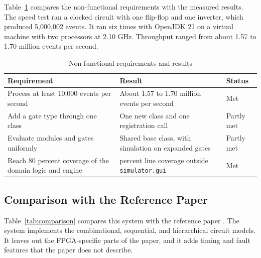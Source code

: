Table~\ref{tab:nfr} compares the non-functional requirements with the measured results.
The speed test ran a clocked circuit with one flip-flop and one inverter, which produced 5,000,002 events.
It ran six times with OpenJDK 21 on a virtual machine with two processors at 2.10 GHz.
Throughput ranged from about 1.57 to 1.70 million events per second.

\begin{table}[H]
\centering
\small
\caption{Non-functional requirements and results}
\label{tab:nfr}
\begin{tabular}{>{\raggedright\arraybackslash}p{6.4cm}>{\raggedright\arraybackslash}p{6.4cm}l}
\toprule
\textbf{Requirement} & \textbf{Result} & \textbf{Status} \\
\midrule
Process at least 10,000 events per second & About 1.57 to 1.70 million events per second & Met \\
Add a gate type through one class & One new class and one registration call & Partly met \\
Evaluate modules and gates uniformly & Shared base class, with simulation on expanded gates & Partly met \\
Reach 80 percent coverage of the domain logic and engine & 91.3 percent line coverage outside \texttt{simulator.gui} & Met \\
\bottomrule
\end{tabular}
\end{table}

\subsection{Comparison with the Reference Paper}

Table~\ref{tab:comparison} compares this system with the reference paper .
The system implements the combinational, sequential, and hierarchical circuit models.
It leaves out the FPGA-specific parts of the paper, and it adds timing and fault features that the paper does not describe.

